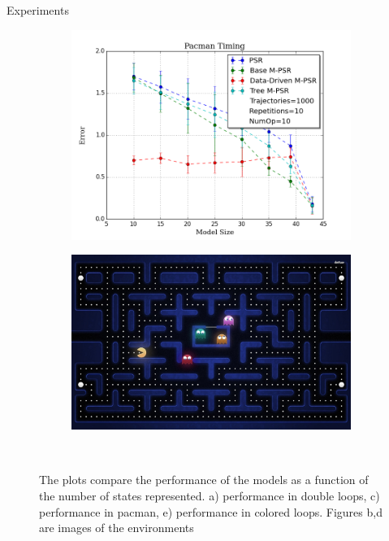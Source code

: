 \documentclass[final]{beamer}
\newlength{\onecolwid}
\begin{document}
\begin{frame}[t]
\begin{columns}[t]
\begin{column}{\onecolwid}
\begin{block}{Experiments}
\begin{figure}
\begin{subfigure}[b]{0.48\textwidth}
        \includegraphics[width=\textwidth]{figs/DLMO/MO_1k.png}
        \caption{}
      \end{subfigure}
      \begin{subfigure}[b]{0.46\textwidth}
        \includegraphics[width=\textwidth]{pac-man.jpg}
        \caption{}
      \end{subfigure}
      
~\caption{The plots compare the performance of the models as a function of the number of states represented. a) performance in double loops, c) performance in pacman, e) performance in colored loops. Figures b,d are images of the environments}
\label{fig:experiments}
  \end{figure}
\end{block}
\vspace{-4.4ex}


\end{column}
\end{columns}
\end{frame}
\end{document}

